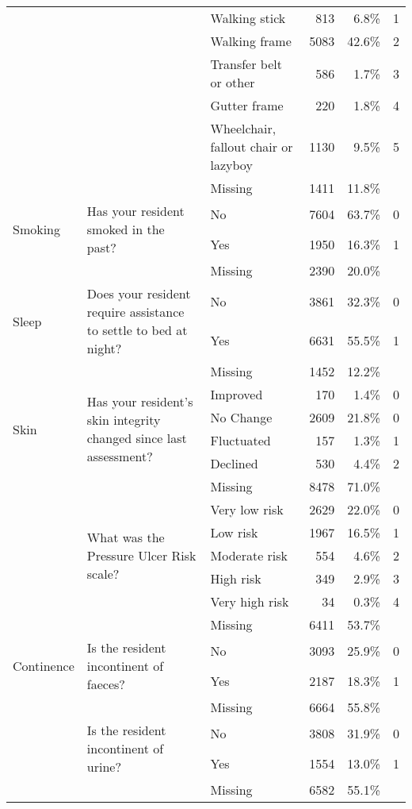 \documentclass{article}
\begin{document}
\begin{table}[htbp]
\begin{tabularx}{\textwidth}{@{}lXlrrc@{}}
 & & Walking stick & 813 & 6.8\% & 1 \\
 & & Walking frame & 5083 & 42.6\% & 2 \\
 & & Transfer belt or other &  586 & 1.7\% & 3 \\
 & & Gutter frame & 220 & 1.8\% & 4 \\
 & & Wheelchair, fallout chair or lazyboy & 1130 & 9.5\% & 5 \\
 & & Missing & 1411 & 11.8\% &  \\
\midrule
\multirow{2}{*}{Smoking} & \multirow{2}{=}{Has your resident smoked in the past?} & No & 7604 & 63.7\% & 0 \\
 & & Yes & 1950 & 16.3\% & 1 \\
 & & Missing & 2390 & 20.0\% &  \\
\midrule
\multirow{2}{*}{Sleep} & \multirow{2}{=}{Does your resident require assistance to settle to bed at night?} & No & 3861 & 32.3\% & 0 \\
 & & Yes & 6631 & 55.5\% & 1 \\
 & & Missing & 1452 & 12.2\% &  \\
\midrule
\multirow{4}{*}{Skin} & \multirow{4}{=}{Has your resident's skin integrity changed since last assessment?} & Improved & 170 & 1.4\% & 0 \\
 & & No Change & 2609 & 21.8\% & 0 \\
 & & Fluctuated & 157 & 1.3\% & 1 \\
 & & Declined & 530 & 4.4\% & 2 \\
 & & Missing & 8478 & 71.0\% &  \\
\cmidrule(l){2-6}
 & \multirow{5}{=}{What was the Pressure Ulcer Risk scale?} & Very low risk & 2629 & 22.0\% & 0 \\
 & & Low risk & 1967 & 16.5\% & 1 \\
 & & Moderate risk & 554 & 4.6\% & 2 \\
 & & High risk & 349 & 2.9\% & 3 \\
 & & Very high risk & 34 & 0.3\% & 4 \\
 & & Missing & 6411 & 53.7\% &  \\
\midrule
\multirow{2}{*}{Continence} & \multirow{2}{=}{Is the resident incontinent of faeces?} & No & 3093 & 25.9\% & 0 \\
 & & Yes & 2187 & 18.3\% & 1 \\
 & & Missing & 6664 & 55.8\% &  \\
\cmidrule(l){2-6}
 & \multirow{2}{=}{Is the resident incontinent of urine?} & No & 3808 & 31.9\% & 0 \\
 & & Yes & 1554 & 13.0\% & 1 \\
 & & Missing & 6582 & 55.1\% &  \\
\bottomrule
\end{tabularx}
\end{table}
\end{document}
